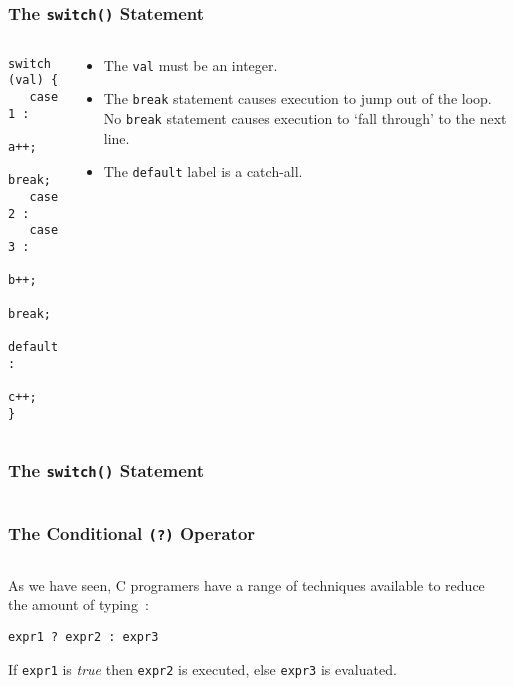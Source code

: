 \begin{frame}[fragile]
\frametitle{The {\tt switch()} Statement}
\begin{columns}

\begin{column}{0.45\textwidth}
\begin{lstlisting}[style=basicc,numbers=none]
switch (val) {
   case 1 :
      a++;
      break;
   case 2 :
   case 3 :
      b++;
      break;
   default :
      c++;
}
\end{lstlisting}
\end{column}

\begin{column}{0.45\textwidth}
\begin{itemize}[<+->]
\item The \verb^val^ must be an integer.
\item The \verb^break^ statement causes execution to jump out
of the loop. No \verb^break^ statement causes execution to
`fall through' to the next line.
\item The \verb^default^ label is a catch-all.
\end{itemize}
\end{column}

\end{columns}
\end{frame}

\begin{frame}[fragile]
\frametitle{The {\tt switch()} Statement}
\begin{columns}

\begin{column}{0.55\textwidth}

\end{column}

\begin{column}{0.40\textwidth}
\end{column}

\end{columns}
\end{frame}

\begin{frame}[fragile]
\frametitle{The Conditional {\tt (?)} Operator}
\begin{columns}

\begin{column}{0.40\textwidth}
As we have seen, C programers have a range of techniques available to reduce the amount of typing~:
\begin{lstlisting}[style=basicc,numbers=none]
expr1 ? expr2 : expr3
\end{lstlisting}

If {\tt expr1} is {\it true} then {\tt expr2} is executed, else
{\tt expr3} is evaluated.
\end{column}

\pause
\begin{column}{0.55\textwidth}

\end{column}

\end{columns}
\end{frame}
